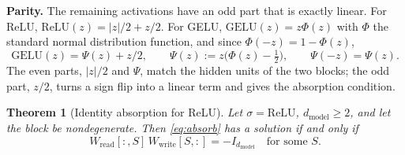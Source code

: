 \documentclass[10pt]{article}
\newtheorem{theorem}{Theorem}[section]
\theoremstyle{definition}
\theoremstyle{remark}
\newcommand{\Wread}{W_{\mathrm{read}}}
\newcommand{\Wwrite}{W_{\mathrm{write}}}
\newcommand{\dm}{d_{\mathrm{model}}}
\newcommand{\para}[1]{\smallskip\noindent\textbf{#1}\hspace{0.5em}}
\begin{document}
\para{Parity.} The remaining activations have an odd part that is exactly linear. For ReLU, $\mathrm{ReLU}(z) = |z|/2 + z/2$. For GELU, $\mathrm{GELU}(z) = z\Phi(z)$ with $\Phi$ the standard normal distribution function, and since $\Phi(-z) = 1 - \Phi(z)$,
\[
\mathrm{GELU}(z) = \Psi(z) + z/2,\qquad \Psi(z) := z\big(\Phi(z) - \tfrac12\big),\qquad \Psi(-z) = \Psi(z).
\]
The even parts, $|z|/2$ and $\Psi$, match the hidden units of the two blocks; the odd part, $z/2$, turns a sign flip into a linear term and gives the absorption condition.

\begin{theorem}[Identity absorption for ReLU]\label{thm:f3}
Let $\sigma = \mathrm{ReLU}$, $\dm \ge 2$, and let the block be nondegenerate. Then \eqref{eq:absorb} has a solution if and only if
\begin{equation}\label{eq:cond}
\Wread[{:},S]\,\Wwrite[S,{:}] = -I_{\dm} \quad\text{for some } S.
\end{equation}
\end{theorem}
\end{document}
